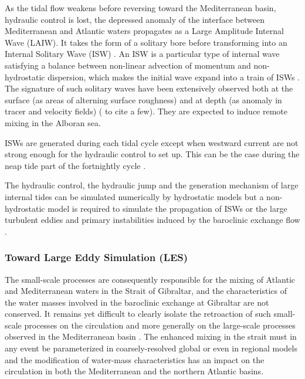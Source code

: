 \color{red}As the tidal flow weakens before reversing toward the Mediterranean basin, hydraulic control is lost\color{black}, the depressed anomaly of the interface between Mediterranean and Atlantic waters propagates as a Large Amplitude Internal Wave (LAIW). It takes the form of a solitary bore before transforming into an Internal Solitary Wave (ISW) \citep{FA1988}. An ISW is a particular type of internal wave satisfying a balance between non-linear advection of momentum and non-hydrostatic dispersion, which makes the initial wave expand into a train of ISWs \citep{vlasenko_2000}. The signature of such solitary waves have been extensively observed both at the surface (as areas of alterning surface roughness) and at depth (as anomaly in tracer and velocity fields) (\citet{ziegenbein_1970,FA1988,watson_1990,sanchezgarrido_2008} to cite a few). %
They are expected to induce remote mixing in the Alboran sea.

ISWs are generated during each tidal cycle except when westward current are not strong enough for the hydraulic control to set up. This can be the case during the neap tide part of the fortnightly cycle \citep{watson_1990}.

The hydraulic control, the hydraulic jump and the generation mechanism of large internal tides can be simulated numerically by hydrostatic models but a non-hydrostatic model is required to simulate the propagation of ISWs or the large turbulent eddies and primary instabilities induced by the baroclinic exchange flow \citep{brandt_1996,vlasenko_2009}.

\subsubsection{Toward Large Eddy Simulation (LES)}

The small-scale processes are consequently responsible for the mixing of Atlantic and Mediterranean waters in the Strait of Gibraltar, and the characteristics of the water masses involved in the baroclinic exchange at Gibraltar are not conserved. It remains yet difficult to clearly isolate the retroaction of such small-scale processes on the circulation and more generally on the large-scale processes observed in the Mediterranean basin \citep{garcia-lafuente_2017}.
The enhanced mixing in the strait must in any event be parameterized in coarsely-resolved global or even in regional models and the modification of water-mass characteristics has an impact on the circulation in both the Mediterranean and the northern Atlantic basins. 

